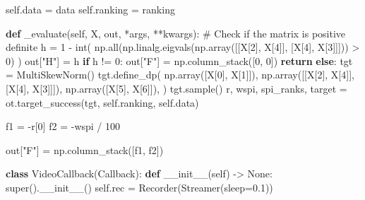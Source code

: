 \documentclass[
  authoryear,
  preprint,
  3p]{elsarticle}
\newenvironment{Shaded}{\begin{snugshade}}{\end{snugshade}}
\newcommand{\BuiltInTok}[1]{\textcolor[rgb]{0.00,0.23,0.31}{#1}}
\newcommand{\CommentTok}[1]{\textcolor[rgb]{0.37,0.37,0.37}{#1}}
\newcommand{\ControlFlowTok}[1]{\textcolor[rgb]{0.00,0.23,0.31}{\textbf{#1}}}
\newcommand{\DecValTok}[1]{\textcolor[rgb]{0.68,0.00,0.00}{#1}}
\newcommand{\FloatTok}[1]{\textcolor[rgb]{0.68,0.00,0.00}{#1}}
\newcommand{\FunctionTok}[1]{\textcolor[rgb]{0.28,0.35,0.67}{#1}}
\newcommand{\KeywordTok}[1]{\textcolor[rgb]{0.00,0.23,0.31}{\textbf{#1}}}
\newcommand{\NormalTok}[1]{\textcolor[rgb]{0.00,0.23,0.31}{#1}}
\newcommand{\OperatorTok}[1]{\textcolor[rgb]{0.37,0.37,0.37}{#1}}
\newcommand{\StringTok}[1]{\textcolor[rgb]{0.13,0.47,0.30}{#1}}
\newcommand{\VariableTok}[1]{\textcolor[rgb]{0.07,0.07,0.07}{#1}}
\begin{document}
\begin{Shaded}
\begin{Highlighting}[]
        \VariableTok{self}\NormalTok{.data }\OperatorTok{=}\NormalTok{ data}
        \VariableTok{self}\NormalTok{.ranking }\OperatorTok{=}\NormalTok{ ranking}

    \KeywordTok{def}\NormalTok{ \_evaluate(}\VariableTok{self}\NormalTok{, X, out, }\OperatorTok{*}\NormalTok{args, }\OperatorTok{**}\NormalTok{kwargs):}
        \CommentTok{\# Check if the matrix is positive definite}
\NormalTok{        h }\OperatorTok{=} \DecValTok{1} \OperatorTok{{-}} \BuiltInTok{int}\NormalTok{(}
\NormalTok{            np.}\BuiltInTok{all}\NormalTok{(np.linalg.eigvals(np.array([[X[}\DecValTok{2}\NormalTok{], X[}\DecValTok{4}\NormalTok{]], [X[}\DecValTok{4}\NormalTok{], X[}\DecValTok{3}\NormalTok{]]])) }\OperatorTok{\textgreater{}} \DecValTok{0}\NormalTok{)}
\NormalTok{        )}
\NormalTok{        out[}\StringTok{"H"}\NormalTok{] }\OperatorTok{=}\NormalTok{ h}
        \ControlFlowTok{if}\NormalTok{ h }\OperatorTok{!=} \DecValTok{0}\NormalTok{:}
\NormalTok{            out[}\StringTok{"F"}\NormalTok{] }\OperatorTok{=}\NormalTok{ np.column\_stack([}\DecValTok{0}\NormalTok{, }\DecValTok{0}\NormalTok{])}
            \ControlFlowTok{return}
        \ControlFlowTok{else}\NormalTok{:}
\NormalTok{            tgt }\OperatorTok{=}\NormalTok{ MultiSkewNorm()}
\NormalTok{            tgt.define\_dp(}
\NormalTok{                np.array([X[}\DecValTok{0}\NormalTok{], X[}\DecValTok{1}\NormalTok{]]),}
\NormalTok{                np.array([[X[}\DecValTok{2}\NormalTok{], X[}\DecValTok{4}\NormalTok{]], [X[}\DecValTok{4}\NormalTok{], X[}\DecValTok{3}\NormalTok{]]]),}
\NormalTok{                np.array([X[}\DecValTok{5}\NormalTok{], X[}\DecValTok{6}\NormalTok{]]),}
\NormalTok{            )}
\NormalTok{            tgt.sample()}
\NormalTok{            r, wspi, spi\_ranks, target }\OperatorTok{=}\NormalTok{ ot.target\_success(tgt, }\VariableTok{self}\NormalTok{.ranking, }\VariableTok{self}\NormalTok{.data)}

\NormalTok{            f1 }\OperatorTok{=} \OperatorTok{{-}}\NormalTok{r[}\DecValTok{0}\NormalTok{]}
\NormalTok{            f2 }\OperatorTok{=} \OperatorTok{{-}}\NormalTok{wspi }\OperatorTok{/} \DecValTok{100}

\NormalTok{            out[}\StringTok{"F"}\NormalTok{] }\OperatorTok{=}\NormalTok{ np.column\_stack([f1, f2])}


\KeywordTok{class}\NormalTok{ VideoCallback(Callback):}
    \KeywordTok{def} \FunctionTok{\_\_init\_\_}\NormalTok{(}\VariableTok{self}\NormalTok{) }\OperatorTok{{-}\textgreater{}} \VariableTok{None}\NormalTok{:}
        \BuiltInTok{super}\NormalTok{().}\FunctionTok{\_\_init\_\_}\NormalTok{()}
        \VariableTok{self}\NormalTok{.rec }\OperatorTok{=}\NormalTok{ Recorder(Streamer(sleep}\OperatorTok{=}\FloatTok{0.1}\NormalTok{))}


\end{Highlighting}
\end{Shaded}
\end{document}
